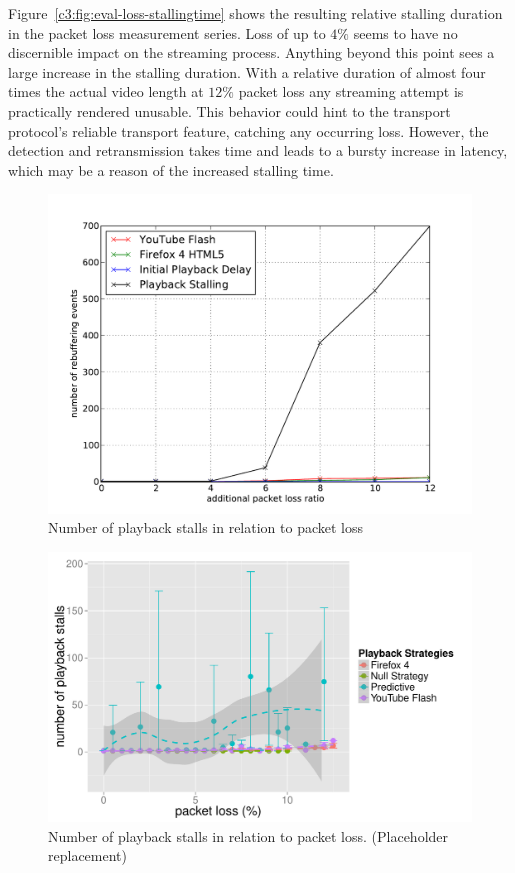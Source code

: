 Figure~\ref{c3:fig:eval-loss-stallingtime} shows the resulting relative stalling duration in the packet loss measurement series. Loss of up to $4\%$ seems to have no discernible impact on the streaming process. Anything beyond this point sees a large increase in the stalling duration. 
With a relative duration of almost four times the actual video length at $12\%$ packet loss any streaming attempt is practically rendered unusable. 
This behavior could hint to the transport protocol's reliable transport feature, catching any occurring loss. However, the detection and retransmission takes time and leads to a bursty increase in latency, which may be a reason of the increased stalling time.

\begin{figure}[htb]
    \centering
    \includegraphics[width=\textwidth]{images/eval-loss4mb-frequency.pdf}
    \caption{Number of playback stalls in relation to packet loss}
    \label{c3:fig:eval-loss-numstalls}
\end{figure}

\begin{figure}[htb]
    \centering
    \includegraphics[width=\textwidth]{images/R-playbackemulation-stallnumber-loss.pdf}
    \caption{Number of playback stalls in relation to packet loss. (Placeholder replacement)}
    \label{c3:fig:eval-loss-numstalls-R}
\end{figure}



